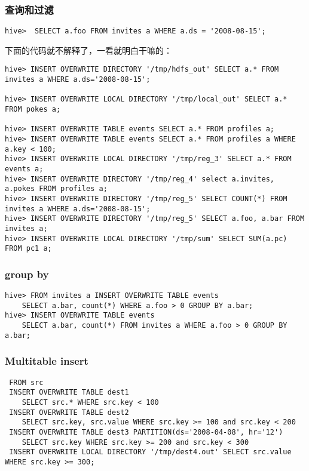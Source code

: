 \documentclass{article}
\begin{document}
\subsubsection{查询和过滤}

\begin{verbatim}
hive>  SELECT a.foo FROM invites a WHERE a.ds = '2008-08-15';
\end{verbatim}

下面的代码就不解释了，一看就明白干嘛的：

\begin{verbatim}
hive> INSERT OVERWRITE DIRECTORY '/tmp/hdfs_out' SELECT a.* FROM invites a WHERE a.ds='2008-08-15';

hive> INSERT OVERWRITE LOCAL DIRECTORY '/tmp/local_out' SELECT a.* FROM pokes a;

hive> INSERT OVERWRITE TABLE events SELECT a.* FROM profiles a;
hive> INSERT OVERWRITE TABLE events SELECT a.* FROM profiles a WHERE a.key < 100;
hive> INSERT OVERWRITE LOCAL DIRECTORY '/tmp/reg_3' SELECT a.* FROM events a;
hive> INSERT OVERWRITE DIRECTORY '/tmp/reg_4' select a.invites, a.pokes FROM profiles a;
hive> INSERT OVERWRITE DIRECTORY '/tmp/reg_5' SELECT COUNT(*) FROM invites a WHERE a.ds='2008-08-15';
hive> INSERT OVERWRITE DIRECTORY '/tmp/reg_5' SELECT a.foo, a.bar FROM invites a;
hive> INSERT OVERWRITE LOCAL DIRECTORY '/tmp/sum' SELECT SUM(a.pc) FROM pc1 a;
\end{verbatim}

\subsubsection{group by}
\begin{verbatim}
hive> FROM invites a INSERT OVERWRITE TABLE events 
	SELECT a.bar, count(*) WHERE a.foo > 0 GROUP BY a.bar;
hive> INSERT OVERWRITE TABLE events 
	SELECT a.bar, count(*) FROM invites a WHERE a.foo > 0 GROUP BY a.bar;
\end{verbatim}

\subsubsection{Multitable insert}
\begin{verbatim}
 FROM src
 INSERT OVERWRITE TABLE dest1 
	SELECT src.* WHERE src.key < 100
 INSERT OVERWRITE TABLE dest2 
	SELECT src.key, src.value WHERE src.key >= 100 and src.key < 200
 INSERT OVERWRITE TABLE dest3 PARTITION(ds='2008-04-08', hr='12') 
	SELECT src.key WHERE src.key >= 200 and src.key < 300
 INSERT OVERWRITE LOCAL DIRECTORY '/tmp/dest4.out' SELECT src.value WHERE src.key >= 300;
\end{verbatim}
\end{document}
